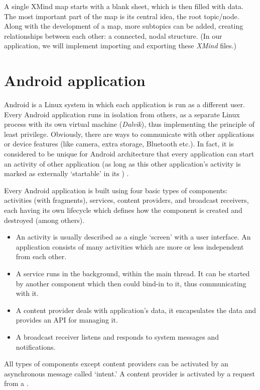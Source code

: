 A single XMind map starts with a blank sheet, which is then filled with data. The most important part of the map is its central idea, the root topic/node. Along with the development of a map, more subtopics can be added, creating relationships between each other: a connected, nodal structure. (In our application, we will implement importing and exporting these {\em XMind} files.)

\section{Android application}
\label{sec:android-theory}

Android is a Linux system in which each application is run as a different user. Every Android application runs in isolation from others, as a separate Linux process with its own virtual machine ({\em Dalvik}), thus implementing the principle of least privilege. Obviously, there are ways to communicate with other applications or device features (like camera, extra storage, Bluetooth etc.). In fact, it is considered to be unique for Android architecture that every application can start an activity of other application (as long as this other application's activity is marked as externally `startable' in its ) \cite{Collins:Android}.

Every Android application is built using four basic types of components: activities (with fragments), services, content providers, and broadcast receivers, each having its own lifecycle which defines how the component is created and destroyed (among others).

\begin{itemize}
	\item An activity is usually described as a single `screen' with a user interface. An application consists of many activities which are more or less independent from each other.
	\item A service runs in the background, within the main thread. It can be started by another component which then could bind-in to it, thus communicating with it.
	\item A content provider deals with application's data, it encapsulates the data and provides an API for managing it.
	\item A broadcast receiver listens and responds to system messages and notifications.
\end{itemize}

All types of components except content providers can be activated by an asynchronous message called `intent.' A content provider is activated by a request from a .

